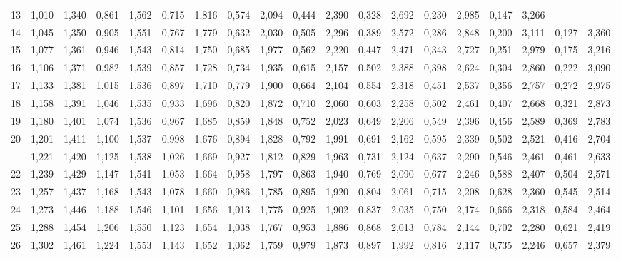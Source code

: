 \documentclass[12pt,a4paper]{article}
\begin{document}
{\begin{longtable}{@{\extracolsep{\fill}}rcccccccccccccccccc@{}}
13 & 1,010 & 1,340 & 0,861 & 1,562 & 0,715 & 1,816 & 0,574 & 2,094 & 0,444 & 2,390 & 0,328 & 2,692 & 0,230 & 2,985 & 0,147 & 3,266 &  &  \\
14 & 1,045 & 1,350 & 0,905 & 1,551 & 0,767 & 1,779 & 0,632 & 2,030 & 0,505 & 2,296 & 0,389 & 2,572 & 0,286 & 2,848 & 0,200 & 3,111 & 0,127 & 3,360 \\
15 & 1,077 & 1,361 & 0,946 & 1,543 & 0,814 & 1,750 & 0,685 & 1,977 & 0,562 & 2,220 & 0,447 & 2,471 & 0,343 & 2,727 & 0,251 & 2,979 & 0,175 & 3,216 \\
16 & 1,106 & 1,371 & 0,982 & 1,539 & 0,857 & 1,728 & 0,734 & 1,935 & 0,615 & 2,157 & 0,502 & 2,388 & 0,398 & 2,624 & 0,304 & 2,860 & 0,222 & 3,090 \\
17 & 1,133 & 1,381 & 1,015 & 1,536 & 0,897 & 1,710 & 0,779 & 1,900 & 0,664 & 2,104 & 0,554 & 2,318 & 0,451 & 2,537 & 0,356 & 2,757 & 0,272 & 2,975 \\
18 & 1,158 & 1,391 & 1,046 & 1,535 & 0,933 & 1,696 & 0,820 & 1,872 & 0,710 & 2,060 & 0,603 & 2,258 & 0,502 & 2,461 & 0,407 & 2,668 & 0,321 & 2,873 \\
19 & 1,180 & 1,401 & 1,074 & 1,536 & 0,967 & 1,685 & 0,859 & 1,848 & 0,752 & 2,023 & 0,649 & 2,206 & 0,549 & 2,396 & 0,456 & 2,589 & 0,369 & 2,783 \\
20 & 1,201 & 1,411 & 1,100 & 1,537 & 0,998 & 1,676 & 0,894 & 1,828 & 0,792 & 1,991 & 0,691 & 2,162 & 0,595 & 2,339 & 0,502 & 2,521 & 0,416 & 2,704 \\
\addlinespace[2pt]
21 & 1,221 & 1,420 & 1,125 & 1,538 & 1,026 & 1,669 & 0,927 & 1,812 & 0,829 & 1,963 & 0,731 & 2,124 & 0,637 & 2,290 & 0,546 & 2,461 & 0,461 & 2,633 \\
22 & 1,239 & 1,429 & 1,147 & 1,541 & 1,053 & 1,664 & 0,958 & 1,797 & 0,863 & 1,940 & 0,769 & 2,090 & 0,677 & 2,246 & 0,588 & 2,407 & 0,504 & 2,571 \\
23 & 1,257 & 1,437 & 1,168 & 1,543 & 1,078 & 1,660 & 0,986 & 1,785 & 0,895 & 1,920 & 0,804 & 2,061 & 0,715 & 2,208 & 0,628 & 2,360 & 0,545 & 2,514 \\
24 & 1,273 & 1,446 & 1,188 & 1,546 & 1,101 & 1,656 & 1,013 & 1,775 & 0,925 & 1,902 & 0,837 & 2,035 & 0,750 & 2,174 & 0,666 & 2,318 & 0,584 & 2,464 \\
25 & 1,288 & 1,454 & 1,206 & 1,550 & 1,123 & 1,654 & 1,038 & 1,767 & 0,953 & 1,886 & 0,868 & 2,013 & 0,784 & 2,144 & 0,702 & 2,280 & 0,621 & 2,419 \\
26 & 1,302 & 1,461 & 1,224 & 1,553 & 1,143 & 1,652 & 1,062 & 1,759 & 0,979 & 1,873 & 0,897 & 1,992 & 0,816 & 2,117 & 0,735 & 2,246 & 0,657 & 2,379 \\

\end{longtable}}
\end{document}
